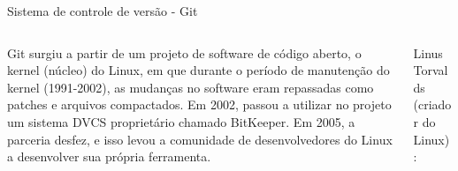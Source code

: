 \documentclass[12pt]{beamer}
\begin{document}
\begin{frame}{Sistema de controle de versão - Git}

	\begin{columns}
	    \begin{column}{0.5\textwidth}  %
	      \begin{center}
	      		\justifying


Git surgiu a partir de um projeto de software de código aberto, o kernel (núcleo) do Linux, em que durante o período de manutenção do kernel (1991-2002), as mudanças no software eram repassadas como patches e arquivos compactados. Em 2002, passou a utilizar no projeto um sistema DVCS proprietário chamado BitKeeper. Em 2005, a parceria desfez, e isso levou a comunidade de desenvolvedores do Linux a desenvolver sua própria ferramenta.

			\end{center}
	    \end{column}\begin{column}{0.5\textwidth}
			 \hspace{2.5mm} Linus Torvalds (criador do Linux):\\			
			\begin{figure}[!htb]
      		\centering
            \includegraphics[scale=0.4]{figuras/linust.jpg} 
         \end{figure}
	    \end{column}
	    
	\end{columns}
  
\end{frame}
\end{document}
